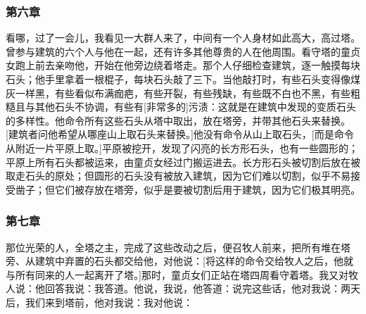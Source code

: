
\subsubsection{第六章}

看哪，过了一会儿，我看见一大群人来了，中间有一个人身材如此高大，高过塔。曾参与建筑的六个人与他在一起，还有许多其他尊贵的人在他周围。看守塔的童贞女跑上前去亲吻他，开始在他旁边绕着塔走。那个人仔细检查建筑，逐一触摸每块石头；他手里拿着一根棍子，每块石头敲了三下。当他敲打时，有些石头变得像煤灰一样黑，有些看似布满痂疤，有些开裂，有些残缺，有些既不白也不黑，有些粗糙且与其他石头不协调，有些有[非常多的]污渍：这就是在建筑中发现的变质石头的多样性。他命令所有这些石头从塔中取出，放在塔旁，并带其他石头来替换。[建筑者问他希望从哪座山上取石头来替换。]他没有命令从山上取石头，[而是命令从附近一片平原上取。]平原被挖开，发现了闪亮的长方形石头，也有一些圆形的；平原上所有石头都被运来，由童贞女经过门搬运进去。长方形石头被切割后放在被取走石头的原处；但圆形的石头没有被放入建筑，因为它们难以切割，似乎不易接受凿子；但它们被存放在塔旁，似乎是要被切割后用于建筑，因为它们极其明亮。\par


\subsubsection{第七章}

那位光荣的人，全塔之主，完成了这些改动之后，便召牧人前来，把所有堆在塔旁、从建筑中弃置的石头都交给他，对他说：[将这样的命令交给牧人之后，他就与所有同来的人一起离开了塔。]那时，童贞女们正站在塔四周看守着塔。我又对牧人说：他回答我说：我答道。他说，我说，他答道：说完这些话，他对我说：两天后，我们来到塔前，他对我说：我对他说：\par

